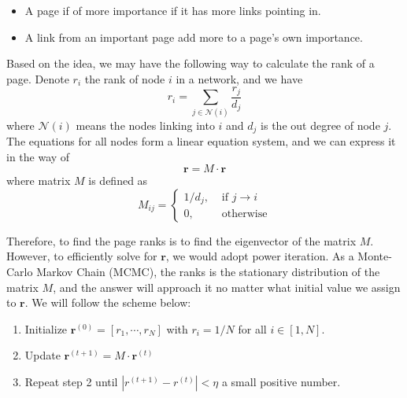 \documentclass[catalog.tex]{subfiles}
\begin{document}
\begin{itemize}
    \item A page if of more importance if it has more links pointing in. 
    
    \item A link from an important page add more to a page's own importance.
\end{itemize}

Based on the idea, we may have the following way to calculate the rank of a page. Denote $r_i$ the rank of node $i$ in a network, and we have
$$
r_i = \sum_{j\in\mathcal{N}(i)} \frac{r_j}{d_j}
$$
where $\mathcal{N}(i)$ means the nodes linking into $i$ and $d_j$ is the out degree of node $j$. The equations for all nodes form a linear equation system, and we can express it in the way of 
$$
\mathbf{r} = M\cdot \mathbf{r}
$$
where matrix $M$ is defined as
$$
M_{ij} = \left\lbrace
\begin{aligned}
    1 / d_j, &\text{ if }j\rightarrow i\\
    0, &\text{ otherwise}
\end{aligned}
\right.
$$

Therefore, to find the page ranks is to find the eigenvector of the matrix $M$. However, to efficiently solve for $\mathbf{r}$, we would adopt power iteration. As a Monte-Carlo Markov Chain (MCMC), the ranks is the stationary distribution of the matrix $M$, and the answer will approach it no matter what initial value we assign to $\mathbf{r}$. We will follow the scheme below:

\begin{enumerate}
    \item Initialize $\mathbf{r}^(0) = [r_1, \cdots, r_N]$ with $r_i=1/N$ for all $i\in[1, N]$.
    \item Update $\mathbf{r}^{(t+1)} = M\cdot\mathbf{r}^{(t)}$
    \item Repeat step 2 until $|r^{(t+1)}-r^{(t)}| < \eta$ a small positive number.
\end{enumerate}
\end{document}
